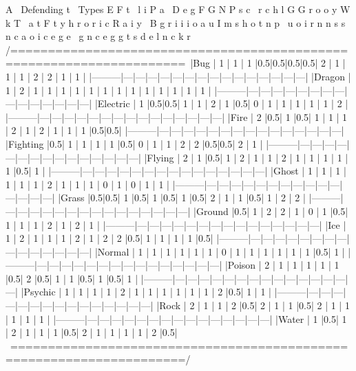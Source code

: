 \documentclass[reprint, aps, prl, paper=A4]{revtex4-1}
\begin{document}
      A \ Defending
      t \   Types        E       F
      t  \               l       i                               P
      a   \          D   e       g   F           G       N   P   s
      c    \         r   c       h   l   G   G   r       o   o   y       W
      k T   \        a   t   F   t   y   h   r   o       r   i   c   R   a
      i y    \   B   g   r   i   i   i   o   a   u   I   m   s   h   o   t
      n p     \  u   o   i   r   n   n   s   s   n   c   a   o   i   c   e
      g e      \ g   n   c   e   g   g   t   s   d   e   l   n   c   k   r
     /=====================================================================\
     |Bug      | 1 | 1 | 1 |0.5|0.5|0.5|0.5| 2 | 1 | 1 | 1 | 2 | 2 | 1 | 1 |
     |---------|---|---|---|---|---|---|---|---|---|---|---|---|---|---|---|
     |Dragon   | 1 | 2 | 1 | 1 | 1 | 1 | 1 | 1 | 1 | 1 | 1 | 1 | 1 | 1 | 1 |
     |---------|---|---|---|---|---|---|---|---|---|---|---|---|---|---|---|
     |Electric | 1 |0.5|0.5| 1 | 1 | 2 | 1 |0.5| 0 | 1 | 1 | 1 | 1 | 1 | 2 |
     |---------|---|---|---|---|---|---|---|---|---|---|---|---|---|---|---|
     |Fire     | 2 |0.5| 1 |0.5| 1 | 1 | 1 | 2 | 1 | 2 | 1 | 1 | 1 |0.5|0.5|
     |---------|---|---|---|---|---|---|---|---|---|---|---|---|---|---|---|
     |Fighting |0.5| 1 | 1 | 1 | 1 |0.5| 0 | 1 | 1 | 2 | 2 |0.5|0.5| 2 | 1 |
     |---------|---|---|---|---|---|---|---|---|---|---|---|---|---|---|---|
     |Flying   | 2 | 1 |0.5| 1 | 2 | 1 | 1 | 2 | 1 | 1 | 1 | 1 | 1 |0.5| 1 |
     |---------|---|---|---|---|---|---|---|---|---|---|---|---|---|---|---|
     |Ghost    | 1 | 1 | 1 | 1 | 1 | 1 | 2 | 1 | 1 | 1 | 0 | 1 | 0 | 1 | 1 |
     |---------|---|---|---|---|---|---|---|---|---|---|---|---|---|---|---|
     |Grass    |0.5|0.5| 1 |0.5| 1 |0.5| 1 |0.5| 2 | 1 | 1 |0.5| 1 | 2 | 2 |
     |---------|---|---|---|---|---|---|---|---|---|---|---|---|---|---|---|
     |Ground   |0.5| 1 | 2 | 2 | 1 | 0 | 1 |0.5| 1 | 1 | 1 | 2 | 1 | 2 | 1 |
     |---------|---|---|---|---|---|---|---|---|---|---|---|---|---|---|---|
     |Ice      | 1 | 2 | 1 | 1 | 1 | 2 | 1 | 2 | 2 |0.5| 1 | 1 | 1 | 1 |0.5|
     |---------|---|---|---|---|---|---|---|---|---|---|---|---|---|---|---|
     |Normal   | 1 | 1 | 1 | 1 | 1 | 1 | 0 | 1 | 1 | 1 | 1 | 1 | 1 |0.5| 1 |
     |---------|---|---|---|---|---|---|---|---|---|---|---|---|---|---|---|
     |Poison   | 2 | 1 | 1 | 1 | 1 | 1 |0.5| 2 |0.5| 1 | 1 |0.5| 1 |0.5| 1 |
     |---------|---|---|---|---|---|---|---|---|---|---|---|---|---|---|---|
     |Psychic  | 1 | 1 | 1 | 1 | 2 | 1 | 1 | 1 | 1 | 1 | 1 | 2 |0.5| 1 | 1 |
     |---------|---|---|---|---|---|---|---|---|---|---|---|---|---|---|---|
     |Rock     | 2 | 1 | 1 | 2 |0.5| 2 | 1 | 1 |0.5| 2 | 1 | 1 | 1 | 1 | 1 |
     |---------|---|---|---|---|---|---|---|---|---|---|---|---|---|---|---|
     |Water    | 1 |0.5| 1 | 2 | 1 | 1 | 1 |0.5| 2 | 1 | 1 | 1 | 1 | 2 |0.5|
     \ =====================================================================/
\end{document}
